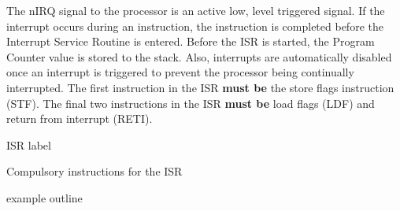 The nIRQ signal to the processor is an active low, level triggered signal.
If the interrupt occurs during an instruction, the instruction is completed before the Interrupt Service Routine is entered.
Before the ISR is started, the Program Counter value is stored to the stack. 
Also, interrupts are automatically disabled once an interrupt is triggered to prevent the processor being continually interrupted.
The first instruction in the ISR \textbf{must be} the store flags instruction (STF). 
The final two instructions in the ISR \textbf{must be} load flags (LDF) and return from interrupt (RETI). 





ISR label

Compulsory instructions for the ISR

example outline

